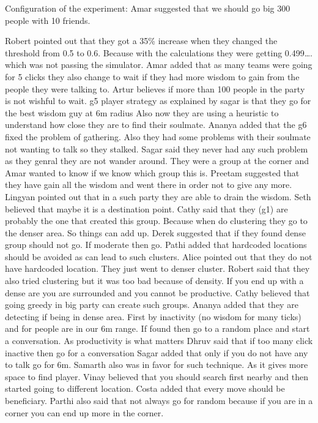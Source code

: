 Configuration of the experiment:
Amar suggested that we should go big 300 people with 10 friends.

Robert pointed out that they got a 35\% increase when they changed the threshold 
from 0.5 to 0.6. Because with the calculations they were getting 0.499…. which 
was not passing the simulator.
Amar added that as many teams were going for 5 clicks they also change to wait 
if they had more wisdom to gain from the people they were talking to.
Artur believes if more than 100 people in the party is not wishful to wait.
g5 player strategy as explained by sagar is that they go for the best wisdom guy at 6m radius
Also now they are using a heuristic to understand how close they are to find their soulmate.
Ananya added that the g6 fixed the problem of gathering. Also they had some problems with their soulmate not wanting to talk so they stalked. 
Sagar said they never had any such problem as they genral they are not wander around.
They were a group at the corner and Amar wanted to know if we know which group this is.
Preetam suggested that they have gain all the wisdom and went there in order not to give any more. 
Lingyan pointed out that in a such party they are able to drain the wisdom.
Seth believed that maybe it is a destination point.
Cathy said that they (g1) are probably the one that created this group. Because 
when do clustering they go to the denser area. So things can add up.
Derek suggested that if they found dense group should not go. If moderate then go.
Pathi added that hardcoded locations should be avoided as can lead to such clusters.
Alice pointed out that they do not have hardcoded location. They just went to denser cluster.
Robert said that they also tried clustering but it was too bad because of density. If you end up with a dense are you are surrounded and you cannot be productive.
Cathy believed that going greedy in big party can create such groups.
Ananya added that they are detecting if being in dense area. First by inactivity (no wisdom for many ticks) and for people are in our 6m range. If found then go to a random place and start a conversation.
As productivity is what matters Dhruv said that if too many click inactive then go for a conversation
Sagar added that only if you do not have any to talk go for 6m.
Samarth also was in favor for such technique. As it gives more space to find player.
Vinay believed that you should search first nearby and then started going to different location.
Costa added that every move should be beneficiary.
Parthi also said that not always go for random because if you are in a corner you can end up more in the corner.


